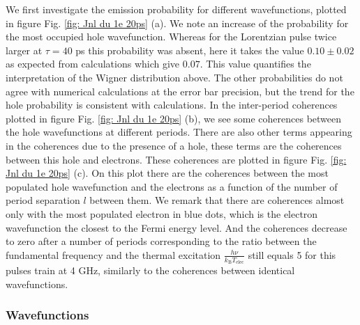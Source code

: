 We first investigate the emission probability for different wavefunctions, plotted in figure Fig. \ref{fig: Jnl du 1e 20ps} (a).
We note an increase of the probability for the most occupied hole wavefunction.
Whereas for the Lorentzian pulse twice larger at $\tau = 40$ ps this probability was absent, here it takes the value $0.10 \pm 0.02$ as expected from calculations which give $0.07$.
This value quantifies the interpretation of the Wigner distribution above.
The other probabilities do not agree with numerical calculations at the error bar precision, but the trend for the hole probability is consistent with calculations.
In the inter-period coherences plotted in figure Fig. \ref{fig: Jnl du 1e 20ps} (b), we see some coherences between the hole wavefunctions at different periods.
There are also other terms appearing in the coherences due to the presence of a hole, these terms are the coherences between this hole and electrons.
These coherences are plotted in figure Fig. \ref{fig: Jnl du 1e 20ps} (c).
On this plot there are the coherences between the most populated hole wavefunction and the electrons as a function of the number of period separation $l$ between them.
We remark that there are coherences almost only with the most populated electron in blue dots, which is the electron wavefunction the closest to the Fermi energy level.
And the coherences decrease to zero after a number of periods corresponding to the ratio between the fundamental frequency and the thermal excitation $\frac{h\nu}{k_{\mathrm{B}}T_{\mathrm{elec}}}$ still equals 5 for this pulses train at 4 GHz, similarly to the coherences between identical wavefunctions.

\subsubsection*{Wavefunctions}

